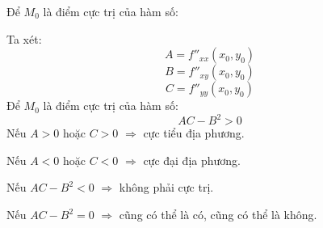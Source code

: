 \documentclass[12pt,a4paper]{report}
\begin{document}
{\begin{center}
\begin{enumerate}
\begin{itemize}
                    Để $M_{0}$ là điểm cực trị của hàm số:

                    Ta xét:
                        \[A = f''_{xx}(x_{0}, y_{0})\]
                        \[B = f''_{xy}(x_{0}, y_{0})\]
                        \[C = f''_{yy}(x_{0}, y_{0})\]
                    \indent Để $M_{0}$ là điểm cực trị của hàm số:
                        \[AC - B^{2} > 0\]
                    Nếu $A > 0$ hoặc $C > 0$ $\Rightarrow$ cực tiểu địa phương.

                    Nếu $A < 0$ hoặc $C < 0$ $\Rightarrow$ cực đại địa phương.
                    
                    Nếu $AC - B^{2} < 0$ $\Rightarrow$ không phải cực trị.

                    Nếu $AC - B^{2} = 0$ $\Rightarrow$ cũng có thể là có, cũng có thể là không.
            \end{itemize}
   				
   		
            
    \end{enumerate}
    
\end{center}




}
\end{document}
